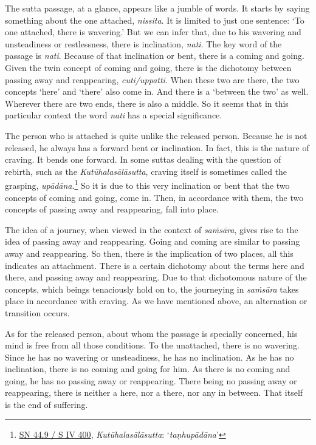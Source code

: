 The sutta passage, at a glance, appears like a jumble of words. It starts by saying something about the one attached, \emph{nissita}. It is limited to just one sentence: `To one attached, there is wavering.' But we can infer that, due to his wavering and unsteadiness or restlessness, there is inclination, \emph{nati}. The key word of the passage is \emph{nati}. Because of that inclination or bent, there is a coming and going. Given the twin concept of coming and going, there is the dichotomy between passing away and reappearing, \emph{cuti/uppatti}. When these two are there, the two concepts `here' and `there' also come in. And there is a `between the two' as well. Wherever there are two ends, there is also a middle. So it seems that in this particular context the word \emph{nati} has a special significance.

The person who is attached is quite unlike the released person. Because he is not released, he always has a forward bent or inclination. In fact, this is the nature of craving. It bends one forward. In some suttas dealing with the question of rebirth, such as the \emph{Kutūhalasālāsutta}, craving itself is sometimes called the grasping, \emph{upādāna}.\footnote{\href{https://suttacentral.net/sn44.9/pli/ms}{SN 44.9 / S IV 400}, \emph{Kutūhalasālāsutta}: `\emph{taṇhupādāna}'} So it is due to this very inclination or bent that the two concepts of coming and going, come in. Then, in accordance with them, the two concepts of passing away and reappearing, fall into place.

The idea of a journey, when viewed in the context of \emph{saṁsāra}, gives rise to the idea of passing away and reappearing. Going and coming are similar to passing away and reappearing. So then, there is the implication of two places, all this indicates an attachment. There is a certain dichotomy about the terms here and there, and passing away and reappearing. Due to that dichotomous nature of the concepts, which beings tenaciously hold on to, the journeying in \emph{saṁsāra} takes place in accordance with craving. As we have mentioned above, an alternation or transition occurs.

As for the released person, about whom the passage is specially concerned, his mind is free from all those conditions. To the unattached, there is no wavering. Since he has no wavering or unsteadiness, he has no inclination. As he has no inclination, there is no coming and going for him. As there is no coming and going, he has no passing away or reappearing. There being no passing away or reappearing, there is neither a here, nor a there, nor any in between. That itself is the end of suffering.

